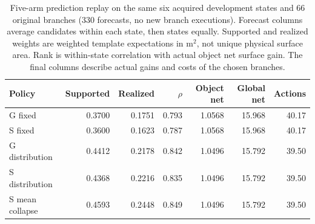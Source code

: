 \begin{table}[tbp]
\centering\small
\setlength{\tabcolsep}{4pt}
\caption{Five-arm prediction replay on the same six acquired development states and 66 original branches (330 forecasts, no new branch executions). Forecast columns average candidates within each state, then states equally. Supported and realized weights are weighted template expectations in m$^2$, not unique physical surface area. Rank is within-state correlation with actual object net surface gain. The final columns describe actual gains and costs of the chosen branches.}
\label{tab:joint-depth-replay}
\begin{tabular}{lrrrrrr}
\toprule
Policy & Supported & Realized & $\rho$ & Object net & Global net & Actions \\
\midrule
G fixed & 0.3700 & 0.1751 & 0.793 & 1.0568 & 15.968 & 40.17 \\
S fixed & 0.3600 & 0.1623 & 0.787 & 1.0568 & 15.968 & 40.17 \\
G distribution & 0.4412 & 0.2178 & 0.842 & 1.0496 & 15.792 & 39.50 \\
S distribution & 0.4368 & 0.2216 & 0.835 & 1.0496 & 15.792 & 39.50 \\
S mean collapse & 0.4593 & 0.2448 & 0.849 & 1.0496 & 15.792 & 39.50 \\
\bottomrule
\end{tabular}
\end{table}
